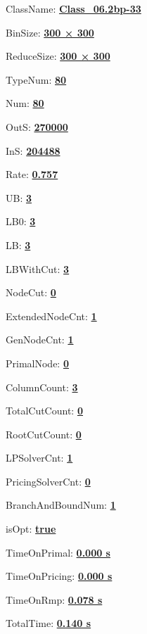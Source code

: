 \documentclass[11pt]{article}
\begin{document}
\pagestyle{empty}


ClassName: \underline{\textbf{Class_06.2bp-33}}
\par
BinSize: \underline{\textbf{300 × 300}}
\par
ReduceSize: \underline{\textbf{300 × 300}}
\par
TypeNum: \underline{\textbf{80}}
\par
Num: \underline{\textbf{80}}
\par
OutS: \underline{\textbf{270000}}
\par
InS: \underline{\textbf{204488}}
\par
Rate: \underline{\textbf{0.757}}
\par
UB: \underline{\textbf{3}}
\par
LB0: \underline{\textbf{3}}
\par
LB: \underline{\textbf{3}}
\par
LBWithCut: \underline{\textbf{3}}
\par
NodeCut: \underline{\textbf{0}}
\par
ExtendedNodeCnt: \underline{\textbf{1}}
\par
GenNodeCnt: \underline{\textbf{1}}
\par
PrimalNode: \underline{\textbf{0}}
\par
ColumnCount: \underline{\textbf{3}}
\par
TotalCutCount: \underline{\textbf{0}}
\par
RootCutCount: \underline{\textbf{0}}
\par
LPSolverCnt: \underline{\textbf{1}}
\par
PricingSolverCnt: \underline{\textbf{0}}
\par
BranchAndBoundNum: \underline{\textbf{1}}
\par
isOpt: \underline{\textbf{true}}
\par
TimeOnPrimal: \underline{\textbf{0.000 s}}
\par
TimeOnPricing: \underline{\textbf{0.000 s}}
\par
TimeOnRmp: \underline{\textbf{0.078 s}}
\par
TotalTime: \underline{\textbf{0.140 s}}
\par
\newpage
\end{document}
